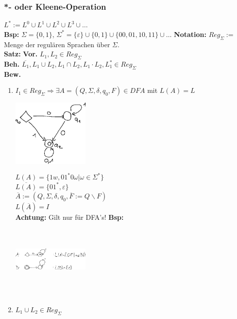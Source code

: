 \documentclass[a4paper,10pt,landscape,twocolumn]{article}
\newcommand{\Bold}[1]{\textbf{#1}} %
\newcommand{\Ra}{\Rightarrow}
\begin{document}
\subsubsection{*- oder Kleene-Operation}
$L^*:=L^0\cup L^1\cup L^2\cup L^3\cup\dots$\\
\Bold{Bsp:} $\Sigma=\{0,1\}$, $\Sigma^*=\{\varepsilon\}\cup\{0,1\}\cup\{00,01,10,11\}\cup\dots$
\Bold{Notation:} $Reg_\Sigma:=$ Menge der regul\"aren Sprachen \"uber $\Sigma$.\\
\Bold{Satz:} \Bold{Vor.} $L_1,L_2\in Reg_\Sigma$\\
\Bold{Beh.} $\overline{L_1},L_1\cup L_2,L_1\cap L_2,L_1\cdot L_2,L_1^*\in Reg_\Sigma$\\[\baselineskip]
\Bold{Bew.}
\begin{enumerate}
 \item $I_1\in Reg_\Sigma\Ra\exists A=(Q,\Sigma,\delta,q_0,F)\in DFA$ mit $L(A)=L$\\
\includegraphics[width=0.3\textwidth,height=4cm,keepaspectratio]{Bild10.eps}\\
 $L(A)=\{1w,01^*0\omega|\omega\in\Sigma^*\}$\\
 $\overline{L(A)}=\{01^*,\varepsilon\}$\\
 $\overline{A}:=(Q,\Sigma,\delta,q_0,\overline{F}:=Q\backslash F)$\\
 $L(\overline{A})=I$\\
 \Bold{Achtung:} Gilt nur f\"ur DFA's!
 \Bold{Bsp:}\\
\includegraphics[width=0.3\textwidth,height=4cm,keepaspectratio]{Bild12.eps}\\
 \item $L_1\cup L_2\in Reg_\Sigma$\\

\end{enumerate}
\end{document}
